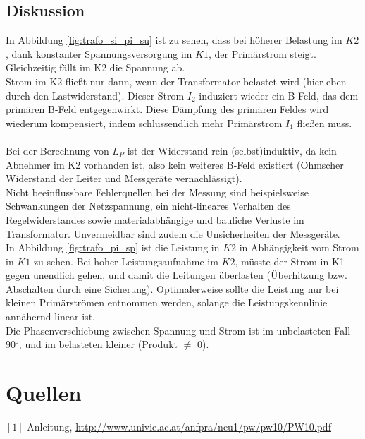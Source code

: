 \documentclass[12pt,a4paper]{article}
\begin{document}
\begin{multicols}{2}

\subsection{Diskussion}

In Abbildung \ref{fig:trafo_si_pi_su} ist zu sehen, dass bei höherer Belastung im $K2$, dank konstanter Spannungsversorgung im $K1$, der Primärstrom steigt.
Gleichzeitig fällt im K2 die Spannung ab.\\
Strom im K2 fließt nur dann, wenn der Transformator belastet wird (hier eben durch den Lastwiderstand). Dieser Strom $I_2$ induziert wieder ein B-Feld, das dem primären B-Feld entgegenwirkt. Diese Dämpfung des primären Feldes wird wiederum kompensiert, indem schlussendlich mehr Primärstrom $I_1$ fließen muss.\\
\\
Bei der Berechnung von $L_P$ ist der Widerstand rein (selbst)induktiv, da kein Abnehmer im K2 vorhanden ist, also kein weiteres B-Feld existiert (Ohmscher Widerstand der Leiter und Messgeräte vernachlässigt).\\
Nicht beeinflussbare Fehlerquellen bei der Messung sind beispielsweise Schwankungen der Netzspannung, ein nicht-lineares Verhalten des Regelwiderstandes sowie materialabhängige und bauliche Verluste im Transformator. Unvermeidbar sind zudem die Unsicherheiten der Messgeräte.\\
In Abbildung \ref{fig:trafo_pi_sp} ist die Leistung in $K2$ in Abhängigkeit vom Strom in $K1$ zu sehen. Bei hoher Leistungsaufnahme im $K2$, müsste der Strom in K1 gegen unendlich gehen, und damit die Leitungen überlasten (Überhitzung bzw. Abschalten durch eine Sicherung).
Optimalerweise sollte die Leistung nur bei kleinen Primärströmen entnommen werden, solange die Leistungskennlinie annähernd linear ist.\\
Die Phasenverschiebung zwischen Spannung und Strom ist im unbelasteten Fall 90$^\circ$, und im belasteten kleiner (Produkt $\not=$ 0).




\section{Quellen}
$[1]$ Anleitung, \url{http://www.univie.ac.at/anfpra/neu1/pw/pw10/PW10.pdf}\\
\end{multicols}
\end{document}
